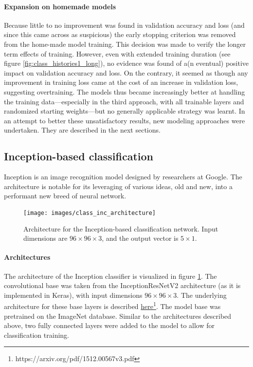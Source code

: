 \paragraph{Expansion on homemade models}
Because little to no improvement was found in validation accuracy and loss (and since this came across as suspicious) the early stopping criterion was removed from the home-made model training. This decision was made to verify the longer term effects of training. However, even with extended training duration (see figure \ref{fig:class_histories1_long}), no evidence was found of a(n eventual) positive impact on validation accuracy and loss. On the contrary, it seemed as though any improvement in training loss came at the cost of an increase in validation loss, suggesting overtraining. The models thus became increasingly better at handling the training data---especially in the third approach, with all trainable layers and randomized starting weights---but no generally applicable strategy was learnt. In an attempt to better these unsatisfactory results, new modeling approaches were undertaken. They are described in the next sections.





\subsection{Inception-based classification}
\label{sec:class_inc}

Inception is an image recognition model designed by researchers at Google. The architecture is notable for its leveraging of various ideas, old and new, into a performant new breed of neural network. 

\begin{figure}[!htbp]
	\begin{center}
		\texttt{[image: images/class\_inc\_architecture]}
		\caption{Architecture for the Inception-based classification network. Input dimensions are $96\times 96\times3$, and the output vector is $5\times1$. }
		\label{fig:class_inc}
	\end{center}
\end{figure}

\paragraph{Architectures} 
The architecture of the Inception classifier is visualized in figure \ref{fig:class_inc}. The convolutional base was taken from the InceptionResNetV2 architecture (as it is implemented in Keras), with input dimensions $96\times 96\times3$. The underlying architecture for these base layers is described \textcolor{blue}{\href{https://github.com/WouterDurnez/003_FinalProject} {here\footnote{https://arxiv.org/pdf/1512.00567v3.pdf}}}. The model base was pretrained on the ImageNet database. Similar to the architectures described above, two fully connected layers were added to the model to allow for classification training.


